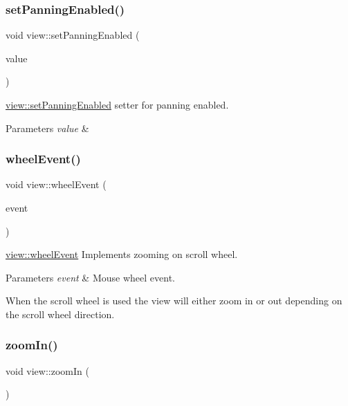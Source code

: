 \subsubsection{\texorpdfstring{set\+Panning\+Enabled()}{setPanningEnabled()}}
{\footnotesize\ttfamily void view\+::set\+Panning\+Enabled (\begin{DoxyParamCaption}\item[{const bool \&}]{value }\end{DoxyParamCaption})}



\mbox{\hyperlink{classview_a78e6621aad0346c49fc9d9e0e4f268f5}{view\+::set\+Panning\+Enabled}} setter for panning enabled. 


\begin{DoxyParams}{Parameters}
{\em value} & \\
\hline
\end{DoxyParams}
\mbox{\label{classview_a7d18b10e6f370227079c552df12d4c02}} 
\subsubsection{\texorpdfstring{wheel\+Event()}{wheelEvent()}}
{\footnotesize\ttfamily void view\+::wheel\+Event (\begin{DoxyParamCaption}\item[{Q\+Wheel\+Event $\ast$}]{event }\end{DoxyParamCaption})}



\mbox{\hyperlink{classview_a7d18b10e6f370227079c552df12d4c02}{view\+::wheel\+Event}} Implements zooming on scroll wheel. 


\begin{DoxyParams}{Parameters}
{\em event} & Mouse wheel event.\\
\hline
\end{DoxyParams}
When the scroll wheel is used the view will either zoom in or out depending on the scroll wheel direction. \mbox{\label{classview_af0f530013cb69c332de83d47d75a8fb0}} 
\subsubsection{\texorpdfstring{zoom\+In()}{zoomIn()}}
{\footnotesize\ttfamily void view\+::zoom\+In (\begin{DoxyParamCaption}{ }\end{DoxyParamCaption})}



